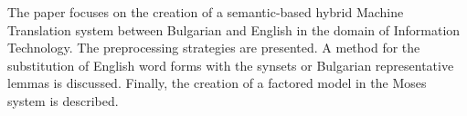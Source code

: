 The paper focuses on the creation of a semantic-based hybrid Machine Translation system between Bulgarian and English in the domain of Information Technology. The preprocessing strategies are presented. A method for the substitution of English word forms with the synsets or Bulgarian representative lemmas is discussed. Finally, the creation of a factored model in the Moses system is described.
